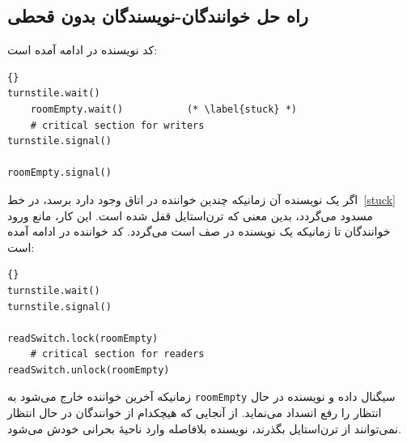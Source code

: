\documentclass{book}
\newcommand{\clearemptydoublepage}{\newpage\cleardoublepage}
\begin{document}
\clearemptydoublepage
\subsection{راه حل خوانندگان-نویسندگان بدون قحطی}  

    کد نویسنده در ادامه آمده است: 

\begin{latin}
\begin{latin}
\begin{lstlisting}[title=\rl{راه حل نویسنده بدون قحطی}]{}
turnstile.wait()
    roomEmpty.wait()           (* \label{stuck} *)
    # critical section for writers
turnstile.signal()

roomEmpty.signal()
\end{lstlisting}
\end{latin}
\end{latin}

    اگر یک نویسنده آن زمانیکه چندین خواننده در اتاق وجود دارد برسد، در خط~\ref{stuck} مسدود می‌گردد، بدین معنی که ترن‌استایل قفل شده است. 
    این کار، مانع ورود خوانندگان تا زمانیکه یک نویسنده در صف است می‌گردد. کد خواننده در ادامه آمده است: 

\begin{latin}
\begin{latin}
\begin{lstlisting}[title=\rl{راه حل خواننده بدون قحطی}]{}
turnstile.wait()
turnstile.signal()

readSwitch.lock(roomEmpty)
    # critical section for readers
readSwitch.unlock(roomEmpty)
\end{lstlisting}
\end{latin}
\end{latin}

    زمانیکه آخرین خواننده خارج می‌شود به {\tt roomEmpty} سیگنال داده و نویسنده در حال انتظار را رفع انسداد می‌نماید. 
    از آنجایی که هیچکدام از خوانندگان در حال انتظار نمی‌توانند از ترن‌استایل بگذرند، نویسنده بلافاصله وارد ناحیهٔ بحرانی خودش می‌شود. 
\end{document}

